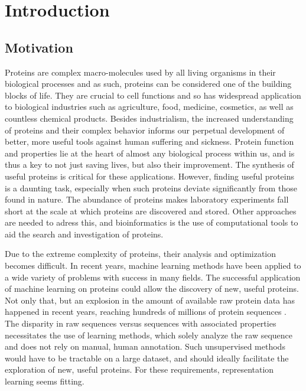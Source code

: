 \chapter{Introduction}
\label{chapter:introduction}
\section{Motivation}
Proteins are complex macro-molecules used by all living organisms in their biological processes and as such, proteins can be considered one of the building blocks of life. They are crucial to cell functions and so has widespread application to biological industries such as agriculture, food, medicine, cosmetics, as well as countless chemical products. Besides industrialism, the increased understanding of proteins and their complex behavior informs our perpetual development of better, more useful tools against human suffering and sickness. Protein function and properties lie at the heart of almost any biological process within us, and is thus a key to not just saving lives, but also their improvement. The synthesis of useful proteins is critical for these applications. However, finding useful proteins is a daunting task, especially when such proteins deviate significantly from those found in nature. The abundance of proteins makes laboratory experiments fall short at the scale at which proteins are discovered and stored. Other approaches are needed to adress this, and bioinformatics is the use of computational tools to aid the search and investigation of proteins.

Due to the extreme complexity of proteins, their analysis and optimization becomes difficult. In recent years, machine learning methods have been applied to a wide variety of problems with success in many fields. The successful application of machine learning on proteins could allow the discovery of new, useful proteins. Not only that, but an explosion in the amount of available raw protein data has happened in recent years, reaching hundreds of millions of protein sequences \cite{uniprot2007universal}. The disparity in raw sequences versus sequences with associated properties necessitates the use of learning methods, which solely analyze the raw sequence and does not rely on manual, human annotation. Such unsupervised methods would have to be tractable on a large dataset, and should ideally facilitate the exploration of new, useful proteins. For these requirements, representation learning seems fitting.

